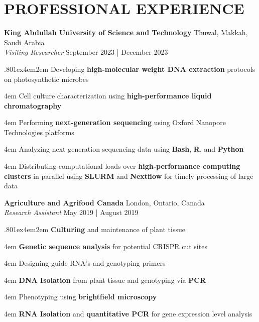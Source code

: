 \documentclass[a4paper,9pt]{extarticle}
\begin{document}
\section*{PROFESSIONAL EXPERIENCE}
\begin{minipage}{1\textwidth} 
\setlength{\parindent}{15pt} %
\noindent
	\textbf{King Abdullah University of Science and Technology} \hfill Thuwal, Makkah, Saudi Arabia\\ %
	\textit{Visiting Researcher} \hfill September 2023 | December 2023 \par %
	{\hsize.80\linewidth\parskip1ex\hangindent4em\parindent2em 
	\setlength{\parskip}{0pt} %
		Developing \textbf{high-molecular weight DNA extraction} protocols on photosynthetic microbes\par
		\hangindent4em
		Cell culture characterization using \textbf{high-performance liquid chromatography}\par
		\hangindent4em
		Performing \textbf{next-generation sequencing} using Oxford Nanopore Technologies platforms\par
		\hangindent4em
		Analyzing next-generation sequencing data using \textbf{Bash}, \textbf{R}, and \textbf{Python}\par
		\hangindent4em
		Distributing computational loads over \textbf{high-performance computing clusters} in parallel using \textbf{SLURM} and \textbf{Nextflow} for timely processing of large data\par}
\end{minipage}
\vspace{\parskip}

\noindent
\begin{minipage}{1\textwidth}
\setlength{\parindent}{15pt} %
	\noindent
	\textbf{Agriculture and Agrifood Canada} \hfill London, Ontario, Canada\\ %
	\textit{Research Assistant} \hfill May 2019 | August 2019  \par %
	{\hsize.80\linewidth\parskip1ex\hangindent4em\parindent2em 
	\setlength{\parskip}{0pt} %
		\textbf{Culturing} and maintenance of plant tissue\par
		\hangindent4em
		\textbf{Genetic sequence analysis} for potential CRISPR cut sites\par
		\hangindent4em
		Designing guide RNA's and genotyping primers\par
		\hangindent4em
		\textbf{DNA Isolation} from plant tissue and genotyping via \textbf{PCR}\par
		\hangindent4em
		Phenotyping using \textbf{brightfield microscopy}\par
		\hangindent4em
		\textbf{RNA Isolation} and \textbf{quantitative PCR} for gene expression level analysis\par}
\end{minipage}
\vspace{\parskip}
\end{document}

